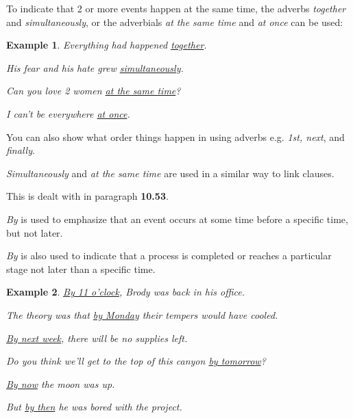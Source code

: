 \documentclass[oneside]{book}
\numberwithin{equation}{section}
\newtheorem{example}{Example}[section]
\begin{document}
%
\noindent{} To indicate that 2 or more events happen at the same time, the adverbs \textit{together} and \textit{simultaneously}, or the adverbials \textit{at the same time} and \textit{at once} can be used:
\begin{example}
    Everything had happened \underline{together}.
    
    His fear and his hate grew \underline{simultaneously}.
    
    Can you love 2 women \underline{at the same time}?
    
    I can't be everywhere \underline{at once}.
\end{example}
%
\noindent{} You can also show what order things happen in using adverbs e.g. \textit{1st, next}, and \textit{finally}.

\textit{Simultaneously} and \textit{at the same time} are used in a similar way to link clauses.

This is dealt with in paragraph \textbf{10.53}.

%
\noindent{} \textit{By} is used to emphasize that an event occurs at some time before a specific time, but not later.

\textit{By} is also used to indicate that a process is completed or reaches a particular stage not later than a specific time.
\begin{example}
    \underline{By 11 o'clock}, Brody was back in his office.
    
    The theory was that \underline{by Monday} their tempers would have cooled.
    
    \underline{By next week}, there will be no supplies left.
    
    Do you think we'll get to the top of this canyon \underline{by tomorrow}?
    
    \underline{By now} the moon was up.
    
    But \underline{by then} he was bored with the project.
\end{example}
\end{document}
